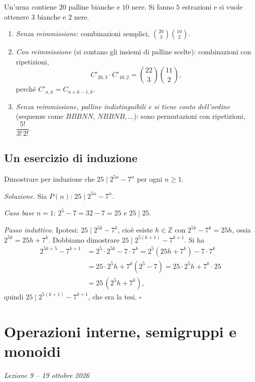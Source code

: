 \documentclass[11pt,a4paper]{article}
\begin{document}
\begin{esempio}[Urna]
Un'urna contiene $20$ palline bianche e $10$ nere. Si fanno $5$ estrazioni e si vuole ottenere $3$ bianche e $2$ nere.
\begin{enumerate}
    \item \emph{Senza reimmissione}: combinazioni semplici, $\binom{20}{3}\binom{10}{2}$.
    \item \emph{Con reimmissione} (si contano gli insiemi di palline scelte): combinazioni con ripetizioni,
    \[
    C'_{20,3}\cdot C'_{10,2} = \binom{22}{3}\binom{11}{2},
    \]
    perché $C'_{n,k} = C_{n+k-1,k}$.
    \item \emph{Senza reimmissione, palline indistinguibili e si tiene conto dell'ordine} (sequenze come $BBBNN$, $NBBNB, \dots$): sono permutazioni con ripetizioni, $\dfrac{5!}{3!\,2!}$.
\end{enumerate}
\end{esempio}

\subsection{Un esercizio di induzione}

\begin{esercizio}
Dimostrare per induzione che $25 \mid 2^{5n} - 7^n$ per ogni $n \ge 1$.
\end{esercizio}

\emph{Soluzione.} Sia $P(n)$: $25 \mid 2^{5n} - 7^n$.

\emph{Caso base} $n = 1$: $2^5 - 7 = 32 - 7 = 25$ e $25 \mid 25$.

\emph{Passo induttivo.} Ipotesi: $25 \mid 2^{5k} - 7^k$, cioè esiste $h \in \mathbb{Z}$ con $2^{5k} - 7^k = 25h$, ossia $2^{5k} = 25h + 7^k$. Dobbiamo dimostrare $25 \mid 2^{5(k+1)} - 7^{k+1}$. Si ha
\begin{align*}
2^{5k+5} - 7^{k+1} &= 2^5 \cdot 2^{5k} - 7 \cdot 7^k = 2^5 (25h + 7^k) - 7 \cdot 7^k \\
&= 25 \cdot 2^5 h + 7^k (2^5 - 7) = 25 \cdot 2^5 h + 7^k \cdot 25 \\
&= 25\,(2^5 h + 7^k),
\end{align*}
quindi $25 \mid 2^{5(k+1)} - 7^{k+1}$, che era la tesi. \hfill $\square$

\section[Operazioni interne, semigruppi e monoidi (Lezione 9 -- 19 ottobre 2026)]{Operazioni interne, semigruppi e monoidi}
\noindent\emph{Lezione 9 -- 19 ottobre 2026}
\end{document}
